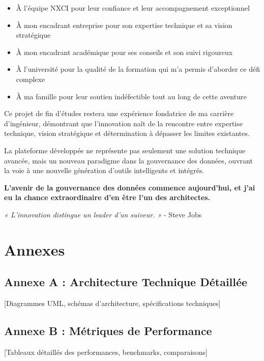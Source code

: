 \documentclass[a4paper,12pt]{article}
\begin{document}
\begin{itemize}
    \item À l'équipe NXCI pour leur confiance et leur accompagnement exceptionnel
    \item À mon encadrant entreprise pour son expertise technique et sa vision stratégique
    \item À mon encadrant académique pour ses conseils et son suivi rigoureux
    \item À l'université pour la qualité de la formation qui m'a permis d'aborder ce défi complexe
    \item À ma famille pour leur soutien indéfectible tout au long de cette aventure
\end{itemize}

Ce projet de fin d'études restera une expérience fondatrice de ma carrière d'ingénieur, démontrant que l'innovation naît de la rencontre entre expertise technique, vision stratégique et détermination à dépasser les limites existantes.

La plateforme développée ne représente pas seulement une solution technique avancée, mais un nouveau paradigme dans la gouvernance des données, ouvrant la voie à une nouvelle génération d'outils intelligents et intégrés.

\textbf{L'avenir de la gouvernance des données commence aujourd'hui, et j'ai eu la chance extraordinaire d'en être l'un des architectes.}

\vspace{2cm}

\begin{center}
\textit{« L'innovation distingue un leader d'un suiveur. »} - Steve Jobs
\end{center}

\newpage

\section{Annexes}

\subsection{Annexe A : Architecture Technique Détaillée}
[Diagrammes UML, schémas d'architecture, spécifications techniques]

\subsection{Annexe B : Métriques de Performance}
[Tableaux détaillés des performances, benchmarks, comparaisons]
\end{document}
